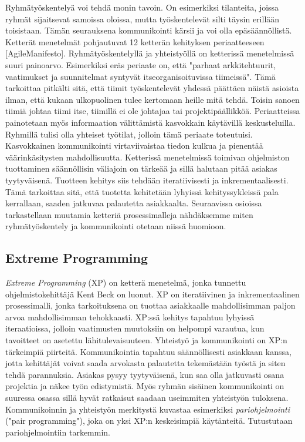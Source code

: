 \documentclass[finnish]{../tktltiki2}
\theoremstyle{definition}
\theoremstyle{remark}
\begin{document}
Ryhmätyöskentelyä voi tehdä monin tavoin. On esimerkiksi tilanteita, joissa ryhmät sijaitsevat samoissa oloissa, mutta työskentelevät silti täysin erillään toisistaan. Tämän seurauksena kommunikointi kärsii ja voi olla epäsäännöllistä. Ketterät menetelmät pohjautuvat 12 ketterän kehityksen periaatteeseen [AgileManifesto]. Ryhmätyöskentelyllä ja yhteistyöllä on ketterissä
menetelmissä suuri painoarvo. Esimerkiksi eräs periaate on, että "parhaat arkkitehtuurit, vaatimukset ja suunnitelmat syntyvät itseorganisoituvissa
tiimeissä". Tämä tarkoittaa pitkälti sitä, että tiimit työskentelevät yhdessä päättäen näistä asioista ilman, että kukaan ulkopuolinen tulee
kertomaan heille mitä tehdä. Toisin sanoen tiimiä johtaa tiimi itse, tiimillä ei ole johtajaa tai projektipäällikköä. Periaatteissa painotetaan
myös informaation välittämistä kasvokkain käytävillä keskusteluilla. Ryhmillä tulisi olla yhteiset työtilat, jolloin tämä periaate toteutuisi.
Kasvokkainen kommunikointi virtaviivaistaa tiedon kulkua ja pienentää väärinkäsitysten mahdollisuutta.
Ketterissä menetelmissä toimivan ohjelmiston tuottaminen säännöllisin väliajoin on tärkeää ja sillä halutaan pitää asiakas tyytyväisenä.
Tuotteen kehitys siis tehdään iteratiivisesti ja inkrementaalisesti. Tämä tarkoittaa sitä, että tuotetta kehitetään lyhyissä kehityssykleissä pala kerrallaan, saaden jatkuvaa palautetta asiakkaalta. Seuraavissa osioissa tarkastellaan muutamia ketteriä prosessimalleja nähdäksemme miten ryhmätyöskentely ja kommunikointi otetaan niissä huomioon.

\subsection{Extreme Programming}

\emph{Extreme Programming} (XP) on ketterä menetelmä, jonka tunnettu ohjelmistokehittäjä Kent Beck on luonut. XP on iteratiivinen ja
inkrementaalinen prosessimalli, jonka tarkoituksena on tuottaa asiakkaalle mahdollisimman paljon arvoa mahdollisimman tehokkaasti.
XP:ssä kehitys tapahtuu lyhyissä iteraatioissa, jolloin vaatimusten muutoksiin on helpompi varautua, kun tavoitteet on asetettu lähitulevaisuuteen. Yhteistyö ja kommunikointi on XP:n tärkeimpiä piirteitä. Kommunikointia tapahtuu säännöllisesti asiakkaan kanssa, jotta kehittäjät voivat saada arvokasta palautetta tekemästään työstä ja siten tehdä parannuksia. Asiakas pysyy tyytyväisenä, kun saa olla jatkuvasti osana projektia ja näkee työn edistymistä. Myös ryhmän sisäinen kommunikointi on suuressa osassa sillä hyvät ratkaisut saadaan useimmiten yhteistyön tuloksena. Kommunikoinnin ja yhteistyön merkitystä kuvastaa esimerkiksi \emph{pariohjelmointi} ("pair programming"), joka on yksi XP:n keskeisimpiä käytänteitä.
Tutustutaan pariohjelmointiin tarkemmin.
\end{document}

